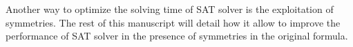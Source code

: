 Another way to optimize the solving time of SAT solver is the exploitation of symmetries. The rest of this manuscript will 
detail how it allow to improve the performance of SAT solver in the presence of symmetries in the original formula.


%
